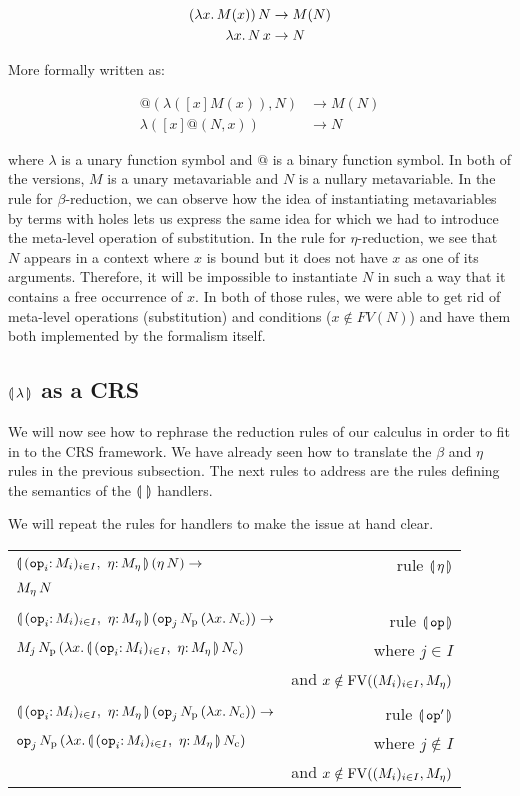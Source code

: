 \begin{align*}
  (\lambda x.\, M(x))\,N & \to M(N) \\
  \lambda x.\, N\,x & \to N
\end{align*}

More formally written as:

\begin{align*}
  @(\lambda([x]M(x)),N) & \to M(N) \\
  \lambda([x]@(N,x)) & \to N
\end{align*}

where $\lambda$ is a unary function symbol and $@$ is a binary function
symbol. In both of the versions, $M$ is a unary metavariable and $N$ is a
nullary metavariable. In the rule for $\beta$-reduction, we can observe how
the idea of instantiating metavariables by terms with holes lets us express
the same idea for which we had to introduce the meta-level operation of
substitution. In the rule for $\eta$-reduction, we see that $N$ appears in
a context where $x$ is bound but it does not have $x$ as one of its
arguments. Therefore, it will be impossible to instantiate $N$ in such a
way that it contains a free occurrence of $x$. In both of those rules, we
were able to get rid of meta-level operations (substitution) and conditions
($x \notin FV(N)$) and have them both implemented by the formalism itself.


\subsection{$\llparenthesis \, \lambda \, \rrparenthesis$ as a CRS}
\label{ssec:banana-as-crs}

We will now see how to rephrase the reduction rules of our calculus in
order to fit in to the CRS framework. We have already seen how to translate
the $\beta$ and $\eta$ rules in the previous subsection. The next
rules to address are the rules defining the semantics of the $\llparenthesis \,  \, \rrparenthesis$
handlers.

We will repeat the rules for handlers to make the issue at hand clear.

\begin{tabular}{lr}
  $\ap{\cibanana}{(\ap{\eta}{N})} \to$ & rule $\llparenthesis \, \eta \, \rrparenthesis$ \\
  $M_\eta\,N$ & \\
  \\
  $\ap{\cibanana}{(\ap{\ap{\op{op}_j}{N_{\mathrm{p}}}}{(\lam{x}{N_{\mathrm{c}}})})} \to$ & rule $\llparenthesis \, \mathtt{op} \, \rrparenthesis$ \\
  $\ap{M_j}{\ap{N_{\mathrm{p}}}{(\lam{x}{\ap{\cibanana}{N_{\mathrm{c}}}})}}$
  & where $j \in I$ \\
  & and $x \notin \operatorname{FV}((M_i)_{i \in I}, M_\eta)$ \\
  \\
  $\ap{\cibanana}{(\ap{\ap{\op{op}_j}{N_{\mathrm{p}}}}{(\lam{x}{N_{\mathrm{c}}})})} \to$ & rule $\llparenthesis \, \mathtt{op}' \, \rrparenthesis$ \\
  $\ap{\op{op}_j}{\ap{N_{\mathrm{p}}}{(\lam{x}{\ap{\cibanana}{N_{\mathrm{c}}}})}}$
  & where $j \notin I$ \\
  & and $x \notin \operatorname{FV}((M_i)_{i \in I}, M_\eta)$
\end{tabular}

